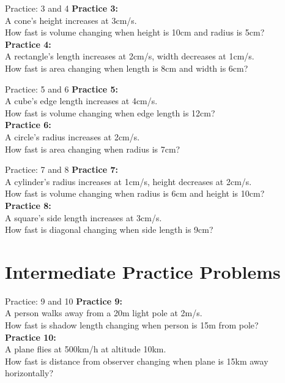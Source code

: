 \documentclass[aspectratio=169]{beamer}
\begin{document}
\begin{frame}{Practice: 3 and 4}
\textbf{Practice 3:} \\
A cone's height increases at 3cm/s. \\
How fast is volume changing when height is 10cm and radius is 5cm? \\
\vspace{1em}
\textbf{Practice 4:} \\
A rectangle's length increases at 2cm/s, width decreases at 1cm/s. \\
How fast is area changing when length is 8cm and width is 6cm?
\end{frame}

\begin{frame}{Practice: 5 and 6}
\textbf{Practice 5:} \\
A cube's edge length increases at 4cm/s. \\
How fast is volume changing when edge length is 12cm? \\
\vspace{1em}
\textbf{Practice 6:} \\
A circle's radius increases at 2cm/s. \\
How fast is area changing when radius is 7cm?
\end{frame}

\begin{frame}{Practice: 7 and 8}
\textbf{Practice 7:} \\
A cylinder's radius increases at 1cm/s, height decreases at 2cm/s. \\
How fast is volume changing when radius is 6cm and height is 10cm? \\
\vspace{1em}
\textbf{Practice 8:} \\
A square's side length increases at 3cm/s. \\
How fast is diagonal changing when side length is 9cm?
\end{frame}

\section{Intermediate Practice Problems}

\begin{frame}{Practice: 9 and 10}
\textbf{Practice 9:} \\
A person walks away from a 20m light pole at 2m/s. \\
How fast is shadow length changing when person is 15m from pole? \\
\vspace{1em}
\textbf{Practice 10:} \\
A plane flies at 500km/h at altitude 10km. \\
How fast is distance from observer changing when plane is 15km away horizontally?
\end{frame}
\end{document}
